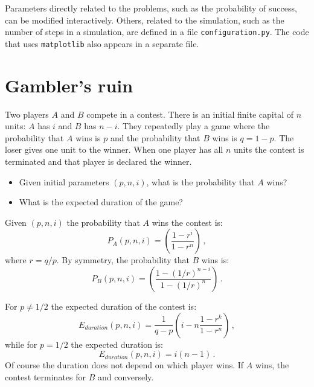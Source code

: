 \documentclass[11pt,a4paper]{article}
\begin{document}
Parameters directly related to the problems, such as the probability of success, can be modified interactively. Others, related to the simulation, such as the number of steps in a simulation, are defined in a file \verb+configuration.py+. The code that uses \verb+matplotlib+ also appears in a separate file.


\section{Gambler's ruin}\label{s.gamblers}

Two players $A$ and $B$ compete in a contest. There is an initial finite capital of $n$ units: $A$ has $i$ and $B$ has $n-i$. They repeatedly play a game where the probability that $A$ wins is $p$ and the probability that $B$ wins is $q=1-p$. The loser gives one unit to the winner. When one player has all $n$ units the contest is terminated and that player is declared the winner.
\begin{center}
\end{center}
\begin{itemize}
\item Given initial parameters $(p, n, i)$, what is the probability that $A$ wins?
\item What is the expected duration of the game?
\end{itemize}

Given $(p,n,i)$ the probability that $A$ wins the contest is:
\[
P_A(p, n, i) = \left(\frac{1-r^{i}}{1-r^n}\right)\,,
\]
where $r=q/p$. By symmetry, the probability that $B$ wins is:
\[
P_B(p, n, i) = \left(\frac{1-(1/r)^{n-i}}{1-(1/r)^{n}}\right)\,.
\]

For $p\neq 1/2$ the expected duration of the contest is:
\[
E_{\mathit{duration}}(p,n,i)=\frac{1}{q-p}\left(i-n
\frac{1-r^k}{1-r^n}\right)\,,
\]
while for $p=1/2$ the expected duration is:
\[
E_{\mathit{duration}}(p,n,i)=i(n-1)\,.
\]
Of course the duration does not depend on which player wins. If $A$ wins, the contest terminates for $B$ and conversely.
\end{document}
